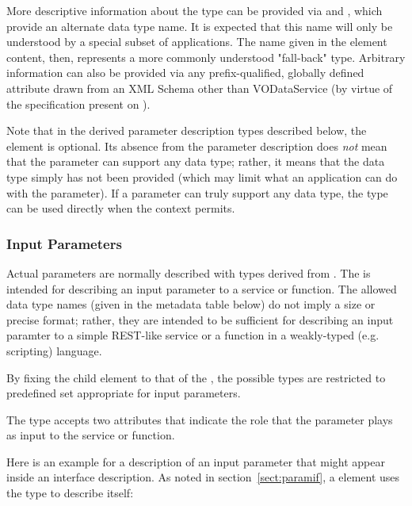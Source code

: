 \documentclass[11pt,a4paper]{ivoa}
\begin{document}
More descriptive information about the type can be provided via
 and , which
provide an alternate data type name.  It is expected that this name
will only be understood by a special subset of applications.  The name
given in the element content, then, represents a more commonly
understood "fall-back" type.   Arbitrary information can also be
provided via any prefix-qualified, globally defined attribute drawn
from an XML Schema other than VODataService (by virtue of the
 specification present
on ).





Note that in the derived parameter description types described below,
the  element is optional.  Its absence
from the parameter description does \emph{not} mean that the
parameter can support any data type; rather, it means that the data
type simply has not been provided (which may limit what an application
can do with the parameter).  If a parameter can truly support any data
type, the  type can be used directly when the
context permits.  


\subsubsection{Input Parameters}
\label{sect:inputparam}


Actual parameters are normally described with types derived from
.  The  is intended
for describing an input parameter to a service or function.  The
allowed data type names (given in the metadata table below) do not
imply a size or precise format; rather, they are intended to be
sufficient for describing an input paramter to a simple REST-like
service or a function in a weakly-typed (e.g. scripting) language.  




By fixing the  child element to that of the
, the possible types are restricted to
predefined set appropriate for input parameters.



The  type accepts two attributes that
indicate the role that the parameter plays as input to the service or
function.


Here is an example for a description
of an input parameter that might appear inside an
 interface description.  As noted in
section~\ref{sect:paramif}, a 
element uses the  type to describe itself:
\end{document}
